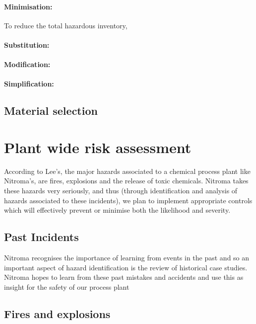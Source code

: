 \paragraph{Minimisation:} To reduce the total hazardous inventory, 



\paragraph{Substitution:}



\paragraph{Modification:}


\paragraph{Simplification:} 






\subsection{Material selection}
\section{Plant wide risk assessment}

According to Lee’s, the major hazards associated to a chemical process plant like Nitroma’s, are fires, explosions and the release of toxic chemicals. Nitroma takes these hazards very seriously, and thus (through identification and analysis of hazards associated to these incidents), we plan to implement appropriate controls which will effectively prevent or minimise both the likelihood and severity. 

\subsection{Past Incidents}

Nitroma recognises the importance of learning from events in the past and so an important aspect of hazard identification is the review of historical case studies. Nitroma hopes to learn from these past mistakes and accidents and use this as insight for the safety of our process plant


\subsection{Fires and explosions}

